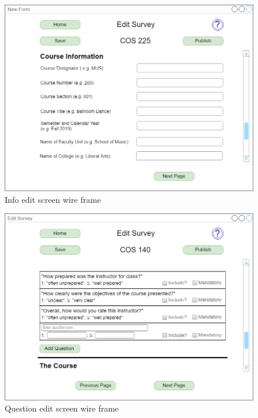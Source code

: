 \documentclass{article}
\begin{document}
\begin{center}
\begin{figure}
    \centering
    \includegraphics[scale=.3]{images/info_edit_screen.png}
    \caption{Info edit screen wire frame}
    \label{fig:my_label}
\end{figure}
\end{center}

\begin{center}
\begin{figure}
    \centering
    \includegraphics[scale=.3]{images/question_edit_screen.png}
    \caption{Question edit screen wire frame}
    \label{fig:my_label}
\end{figure}
\end{center}
\end{document}
